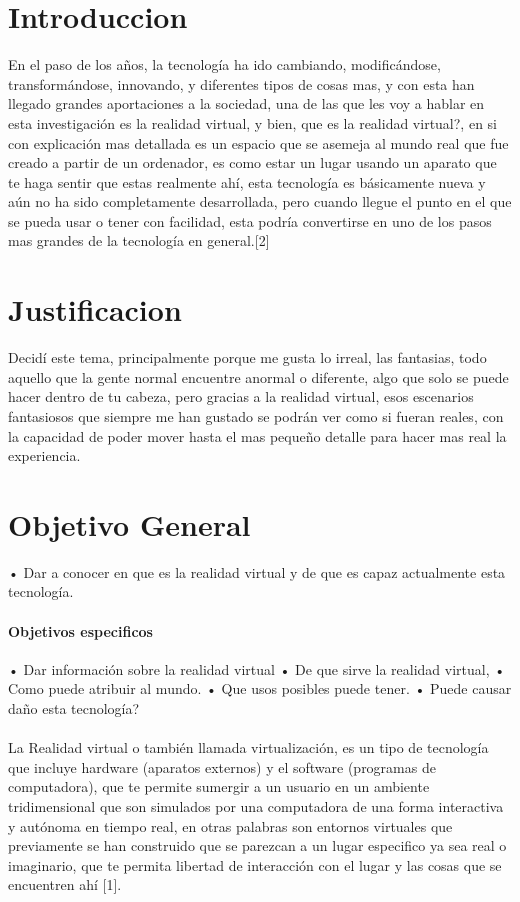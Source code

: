 \documentclass{bmcart}
\begin{document}

\section*{Introduccion}
En el paso de los años, la tecnología ha ido cambiando, modificándose, transformándose, innovando, y diferentes tipos de cosas mas, y con esta han llegado grandes aportaciones a la sociedad, una de las que les voy a hablar en esta investigación es la realidad virtual, y bien, que es la realidad virtual?, en si con explicación mas detallada es un espacio que se asemeja al mundo real que fue creado a partir de un ordenador, es como estar un lugar usando un aparato que te haga sentir que estas realmente ahí, esta tecnología es básicamente nueva y aún no ha sido completamente desarrollada, pero cuando llegue el punto en el que se pueda usar o tener con facilidad, esta podría convertirse en uno de los pasos mas grandes de la tecnología en general.[2] %

\section*{Justificacion}
Decidí este tema, principalmente porque me gusta lo irreal, las fantasias, todo aquello que la gente normal encuentre anormal o diferente, algo que solo se puede hacer dentro de tu cabeza, pero gracias a la realidad virtual, esos escenarios fantasiosos que siempre me han gustado se podrán ver como si fueran reales, con la capacidad de poder mover hasta el mas pequeño detalle para hacer mas real la experiencia. 
\section*{Objetivo General}
•	Dar a conocer en que es la realidad virtual y de que es capaz actualmente esta tecnología.
\paragraph{Objetivos especificos}
•	Dar información sobre la realidad virtual
•	De que sirve la realidad virtual,
•	Como puede atribuir al mundo.
•	Que usos posibles puede tener.
•	Puede causar daño esta tecnología?

\paragraph*{}
La Realidad virtual o también llamada virtualización, es un tipo de tecnología que incluye hardware (aparatos externos) y el software (programas de computadora), que te permite sumergir a un usuario en un ambiente tridimensional que son simulados por una computadora de una forma interactiva y autónoma en tiempo real, en otras palabras son entornos virtuales que previamente se han construido que se parezcan a un lugar especifico ya sea real o imaginario, que te permita libertad de interacción con el lugar y las cosas que se encuentren ahí [1].
\end{document}
